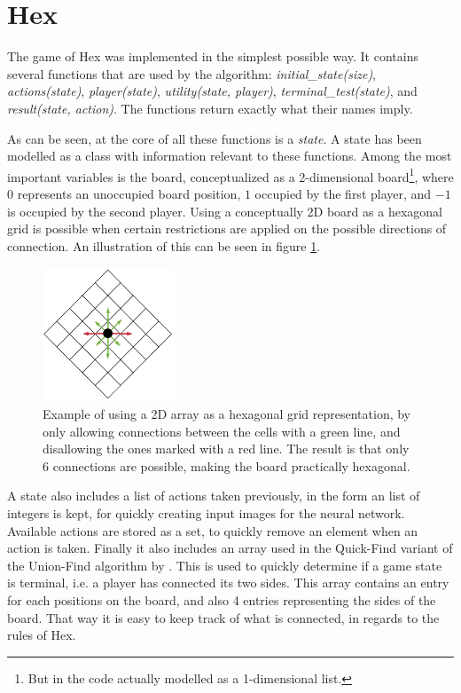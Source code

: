 \section{Hex}
The game of Hex was implemented in the simplest possible way. It contains several functions that are used by the algorithm: \textit{initial\_state(size)}, \textit{actions(state)}, \textit{player(state)}, \textit{utility(state, player)}, \textit{terminal\_test(state)}, and \textit{result(state, action)}. The functions return exactly what their names imply.

As can be seen, at the core of all these functions is a \textit{state}. A state has been modelled as a class with information relevant to these functions. Among the most important variables is the board, conceptualized as a 2-dimensional board\footnote{But in the code actually modelled as a 1-dimensional list.}, where $0$ represents an unoccupied board position, $1$ occupied by the first player, and $-1$ is occupied by the second player. Using a conceptually 2D board as a hexagonal grid is possible when certain restrictions are applied on the possible directions of connection. An illustration of this can be seen in figure \ref{fig-2d-hex}.

\begin{figure}[ht]
	\centering
	\includegraphics[width=0.35\textwidth]{figures/2d-to-hex}
	\caption{Example of using a 2D array as a hexagonal grid representation, by only allowing connections between the cells with a green line, and disallowing the ones marked with a red line. The result is that only 6 connections are possible, making the board practically hexagonal.}
	\label{fig-2d-hex}
\end{figure}

A state also includes a list of actions taken previously, in the form an list of integers is kept, for quickly creating input images for the neural network. Available actions are stored as a set, to quickly remove an element when an action is taken. Finally it also includes an array used in the Quick-Find variant of the Union-Find algorithm by \citeauthor{Sedgewick2011}\cite{Sedgewick2011}. This is used to quickly determine if a game state is terminal, i.e. a player has connected its two sides. This array contains an entry for each positions on the board, and also 4 entries representing the sides of the board. That way it is easy to keep track of what is connected, in regards to the rules of Hex.

